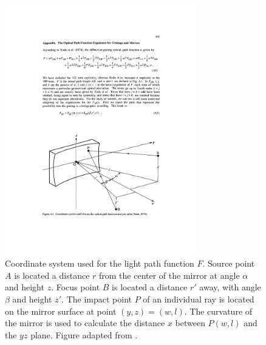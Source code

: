 \begin{figure}
	\centering
	\includegraphics[width=0.75\textwidth]{figures/chap2/LPF_geometry.pdf}
	\caption{Coordinate system used for the light path function $F$. Source point $A$ is located a distance $r$ from the center of the mirror at angle $\alpha$ and height $z$. Focus point $B$ is located a distance $r'$ away, with angle $\beta$ and height $z'$. The impact point $P$ of an individual ray is located on the mirror surface at point $(y,z) = (w,l)$. The curvature of the mirror is used to calculate the distance $x$ between $P(w, l)$ and the $yz$ plane. Figure adapted from \cite{howellsMirrorsSynchrotronRadiationBeamlines1994}.}
	\label{fig:LPF_geometry}
\end{figure}


